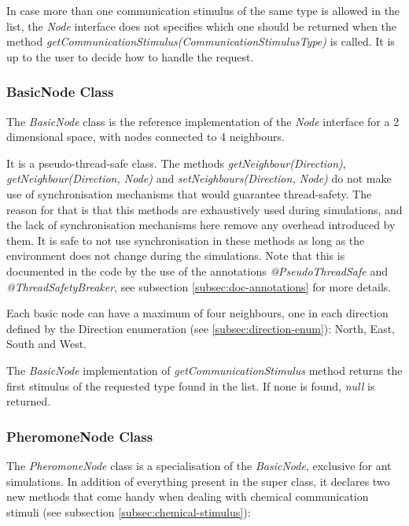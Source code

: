 In case more than one communication stimulus of the same type is allowed in the list, the \emph{Node} interface does not specifies which one should be returned when the method \emph{getCommunicationStimulus(CommunicationStimulusType)} is called. It is up to the user to decide how to handle the request.

\subsubsection{BasicNode Class}

The \emph{BasicNode} class is the reference implementation of the \emph{Node} interface for a 2 dimensional space, with nodes connected to 4 neighbours.

It is a pseudo-thread-safe class. The methods \emph{getNeighbour(Direction)}, \emph{getNeighbour(Direction, Node)} and \emph{setNeighbours(Direction, Node)} do not make use of synchronisation mechanisms that would guarantee thread-safety. The reason for that is that this methods are exhaustively used during simulations, and the lack of synchronisation mechanisms here remove any overhead introduced by them. It is safe to not use synchronisation in these methods as long as the environment does not change during the simulations. Note that this is documented in the code by the use of the annotations \emph{@PseudoThreadSafe} and \emph{@ThreadSafetyBreaker}, see subsection \ref{subsec:doc-annotations} for more details.

Each basic node can have a maximum of four neighbours, one in each direction defined by the Direction enumeration (see \ref{subsec:direction-enum}): North, East, South and West.

The \emph{BasicNode} implementation of \emph{getCommunicationStimulus} method returns the first stimulus of the requested type found in the list. If none is found, \emph{null} is returned.

\subsubsection{PheromoneNode Class}

The \emph{PheromoneNode} class is a specialisation of the \emph{BasicNode}, exclusive for ant simulations. In addition of everything present in the super class, it declares two new methods that come handy when dealing with chemical communication stimuli (see subsection \ref{subsec:chemical-stimulus}):

